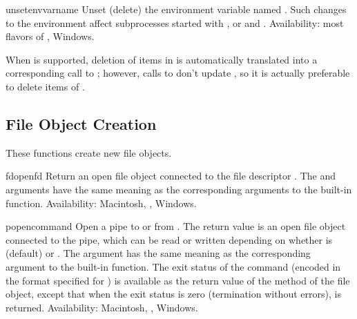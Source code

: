 \begin{funcdesc}{unsetenv}{varname}
Unset (delete) the environment variable named . Such
changes to the environment affect subprocesses started with
,  or  and
. Availability: most flavors of \UNIX, Windows.

When  is
supported, deletion of items in  is automatically
translated into a corresponding call to ; however,
calls to  don't update , so it is
actually preferable to delete items of .
\end{funcdesc}

\subsection{File Object Creation \label{os-newstreams}}

These functions create new file objects.


\begin{funcdesc}{fdopen}{fd}
Return an open file object connected to the file descriptor .
The  and  arguments have the same meaning as
the corresponding arguments to the built-in 
function.
Availability: Macintosh, \UNIX, Windows.

\end{funcdesc}

\begin{funcdesc}{popen}{command}
Open a pipe to or from .  The return value is an open
file object connected to the pipe, which can be read or written
depending on whether  is  (default) or .
The  argument has the same meaning as the corresponding
argument to the built-in  function.  The exit status of
the command (encoded in the format specified for ) is
available as the return value of the  method of the file
object, except that when the exit status is zero (termination without
errors),  is returned.
Availability: Macintosh, \UNIX, Windows.

\end{funcdesc}

